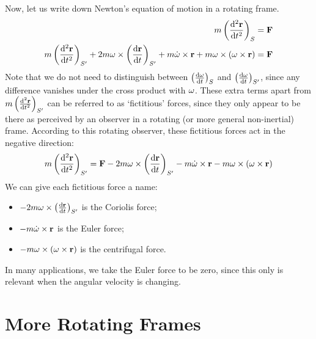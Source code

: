 \documentclass{article}
\begin{document}
Now, let us write down Newton's equation of motion in a rotating frame.
\begin{align*}
	m\left( \dv[2]{\vb r}{t} \right)_S                                                                                                                                          & = \vb F \\
	m\left( \dv[2]{\vb r}{t} \right)_{S'} + 2 m\vb\omega \times \left( \dv{\vb r}{t} \right)_{S'} + m\dot{\vb\omega} \times \vb r + m\vb\omega \times (\vb \omega \times \vb r) & = \vb F \\
\end{align*}
Note that we do not need to distinguish between $\left( \dv{\vb\omega}{t} \right)_S$ and $\left( \dv{\vb\omega}{t} \right)_{S'}$, since any difference vanishes under the cross product with $\vb\omega$. These extra terms apart from $m\left( \dv[2]{\vb r}{t} \right)_{S'}$ can be referred to as `fictitious' forces, since they only appear to be there as perceived by an observer in a rotating (or more general non-inertial) frame. According to this rotating observer, these fictitious forces act in the negative direction:
\[ m\left( \dv[2]{\vb r}{t} \right)_{S'} = \vb F - 2 m\vb\omega \times \left( \dv{\vb r}{t} \right)_{S'} - m\dot{\vb\omega} \times \vb r - m\vb\omega \times (\vb \omega \times \vb r) \]
We can give each fictitious force a name:
\begin{itemize}
	\item $-2 m\vb\omega \times \left( \dv{\vb r}{t} \right)_{S'}$ is the Coriolis force;
	\item $-m\dot{\vb\omega} \times \vb r$ is the Euler force;
	\item $-m\vb\omega \times (\vb \omega \times \vb r)$ is the centrifugal force.
\end{itemize}
In many applications, we take the Euler force to be zero, since this only is relevant when the angular velocity is changing.

\section{More Rotating Frames}
\end{document}
